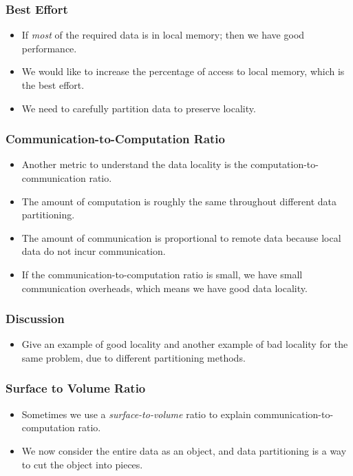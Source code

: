 \documentclass{beamer}
\begin{document}
\begin{CJK}{UTF8}{bsmi}
\begin{frame}
\frametitle{Best Effort}
\begin{itemize}
\item If {\em most} of the required data is in local memory; then we have good performance.
\item We would like to increase the percentage of access to local memory, which is the best effort.
\item We need to carefully partition data to preserve locality.
\end{itemize}
\end{frame}

\begin{frame}
\frametitle{Communication-to-Computation Ratio}
\begin{itemize}
\item Another metric to understand the data locality is the computation-to-communication ratio.
\item The amount of computation is roughly the same throughout different data partitioning.
\item The amount of communication is proportional to remote data because local data do not incur communication.
\item If the communication-to-computation ratio is small, we have small communication overheads, which means we have good data locality.
\end{itemize}
\end{frame}

\begin{frame}
\frametitle{Discussion}
\begin{itemize}
\item Give an example of good locality and another example of bad locality for the same problem, due to different partitioning methods.
\end{itemize}
\end{frame}


\begin{frame}
\frametitle{Surface to Volume Ratio}
\begin{itemize}
\item Sometimes we use a {\em surface-to-volume} ratio to explain communication-to-computation ratio.
\item We now consider the entire data as an object, and data partitioning is a way to cut the object into pieces.
\end{itemize}
\end{frame}



\end{CJK}
\end{document}
